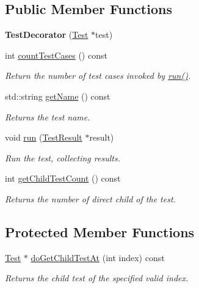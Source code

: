 \subsection*{Public Member Functions}
\begin{DoxyCompactItemize}
\item 
\hypertarget{class_test_decorator_a227e67c84146b23a37b44c24877b45d9}{{\bfseries Test\-Decorator} (\hyperlink{class_test}{Test} $\ast$test)}\label{class_test_decorator_a227e67c84146b23a37b44c24877b45d9}

\item 
int \hyperlink{class_test_decorator_add3b489dfb3331eba0aee7e06b03548b}{count\-Test\-Cases} () const 
\begin{DoxyCompactList}\small\item\em Return the number of test cases invoked by \hyperlink{class_test_decorator_a64dd70aae76f31f2e2f7b5ac84a8e829}{run()}. \end{DoxyCompactList}\item 
std\-::string \hyperlink{class_test_decorator_acdcf679bba926032d2e4535fca1e9cf0}{get\-Name} () const 
\begin{DoxyCompactList}\small\item\em Returns the test name. \end{DoxyCompactList}\item 
\hypertarget{class_test_decorator_a64dd70aae76f31f2e2f7b5ac84a8e829}{void \hyperlink{class_test_decorator_a64dd70aae76f31f2e2f7b5ac84a8e829}{run} (\hyperlink{class_test_result}{Test\-Result} $\ast$result)}\label{class_test_decorator_a64dd70aae76f31f2e2f7b5ac84a8e829}

\begin{DoxyCompactList}\small\item\em Run the test, collecting results. \end{DoxyCompactList}\item 
\hypertarget{class_test_decorator_aa2fbf0467c6bd599f912415a097e087c}{int \hyperlink{class_test_decorator_aa2fbf0467c6bd599f912415a097e087c}{get\-Child\-Test\-Count} () const }\label{class_test_decorator_aa2fbf0467c6bd599f912415a097e087c}

\begin{DoxyCompactList}\small\item\em Returns the number of direct child of the test. \end{DoxyCompactList}\end{DoxyCompactItemize}
\subsection*{Protected Member Functions}
\begin{DoxyCompactItemize}
\item 
\hyperlink{class_test}{Test} $\ast$ \hyperlink{class_test_decorator_a029da80376365525d52387a88e6837f4}{do\-Get\-Child\-Test\-At} (int index) const 
\begin{DoxyCompactList}\small\item\em Returns the child test of the specified valid index. \end{DoxyCompactList}\end{DoxyCompactItemize}
